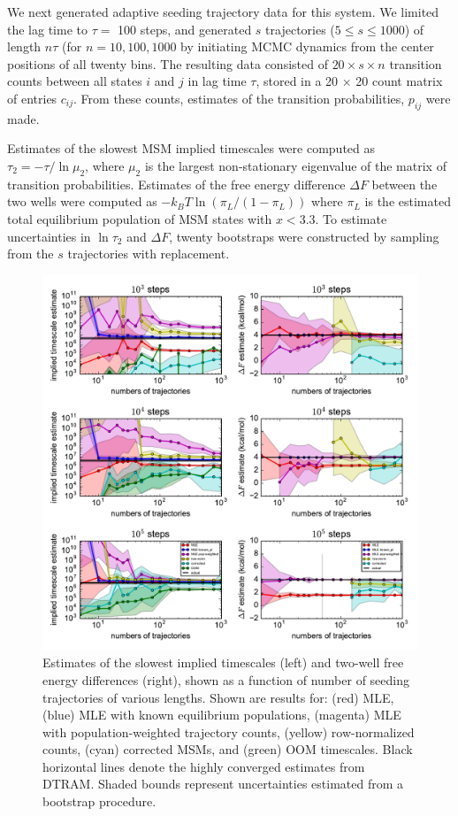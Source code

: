 \documentclass[%
 aip,
rsi,%
 amsmath,amssymb,
 reprint,%
]{revtex4-1}
\begin{document}
We next generated adaptive seeding trajectory data for this system.  We limited the lag time to $\tau =$ 100 steps, and generated $s$ trajectories ($5\leq s \leq 1000$) of length $n\tau$ (for $n=10,100,1000$ by initiating MCMC dynamics from the center positions of all twenty bins.  The resulting data consisted of $20 \times s \times n$ transition counts between all states $i$ and $j$ in lag time $\tau$, stored in a 20 $\times$ 20 count matrix of entries $c_{ij}$.  From these counts, estimates of the transition probabilities, $p_{ij}$ were made. 

Estimates of the slowest MSM implied timescales were computed as $\tau_2 = -\tau/\ln \mu_2$, where $\mu_2$ is the largest non-stationary eigenvalue of the matrix of transition probabilities.  Estimates of the free energy difference $\Delta F$ between the two wells were computed as $-k_BT \ln (\pi_L/(1-\pi_L))$ where $\pi_L$ is the estimated total equilibrium population of MSM states with $x<3.3$. To estimate uncertainties in $\ln \tau_2$ and $\Delta F$, twenty bootstraps were constructed by sampling from the $s$ trajectories with replacement.

\begin{figure}
\includegraphics[width=1.7\columnwidth]{figures/convergence_oct2018.pdf}%
\caption{\label{fig:toy-estimation}Estimates of the slowest implied timescales (left) and two-well free energy differences (right), shown as a function of number of seeding trajectories of various lengths. Shown are results for: (red) MLE, (blue) MLE with known equilibrium populations, (magenta) MLE with population-weighted trajectory counts, (yellow) row-normalized counts, (cyan) corrected MSMs, and (green) OOM timescales. Black horizontal lines denote the highly converged estimates from DTRAM.  Shaded bounds represent uncertainties estimated from a bootstrap procedure.}
\end{figure}
\end{document}
